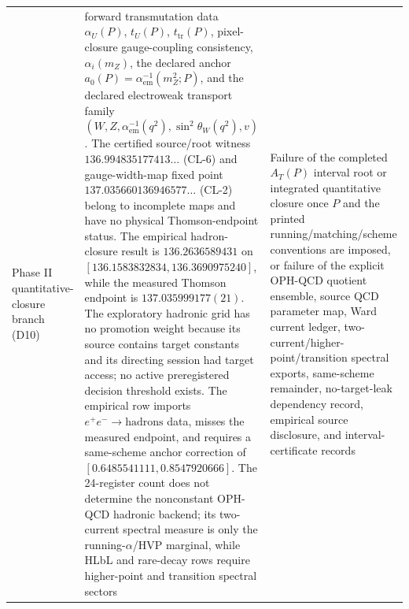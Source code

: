 \documentclass[11pt]{article}
\begin{document}
\begin{longtable}{@{}>{\raggedright\arraybackslash}p{}>{\raggedright\arraybackslash}p{}>{\raggedright\arraybackslash}p{}@{}}
Phase II quantitative-closure branch (D10) & forward transmutation data \(\alpha_U(P)\), \(t_U(P)\), \(t_{\mathrm{tr}}(P)\), pixel-closure gauge-coupling consistency, \(\alpha_i(m_Z)\), the declared anchor \(a_0(P)=\alpha_{\mathrm{em}}^{-1}(m_Z^2;P)\), and the declared electroweak transport family \((W,Z,\alpha_{\mathrm{em}}^{-1}(q^2),\sin^2\theta_W(q^2),v)\). The certified source/root witness \(136.994835177413\ldots\) (CL-6) and gauge-width-map fixed point \(137.035660136946577\ldots\) (CL-2) belong to incomplete maps and have no physical Thomson-endpoint status. The empirical hadron-closure result is \(136.2636589431\) on \([136.1583832834,136.3690975240]\), while the measured Thomson endpoint is \(137.035999177(21)\). The exploratory hadronic grid has no promotion weight because its source contains target constants and its directing session had target access; no active preregistered decision threshold exists. The empirical row imports \(e^+e^-\to\mathrm{hadrons}\) data, misses the measured endpoint, and requires a same-scheme anchor correction of \([0.6485541111,0.8547920666]\). The 24-register count does not determine the nonconstant OPH-QCD hadronic backend; its two-current spectral measure is only the running-\(\alpha\)/HVP marginal, while HLbL and rare-decay rows require higher-point and transition spectral sectors & Failure of the completed \(A_T(P)\) interval root or integrated quantitative closure once \(P\) and the printed running/matching/scheme conventions are imposed, or failure of the explicit OPH-QCD quotient ensemble, source QCD parameter map, Ward current ledger, two-current/higher-point/transition spectral exports, same-scheme remainder, no-target-leak dependency record, empirical source disclosure, and interval-certificate records \\

\end{longtable}
\end{document}
